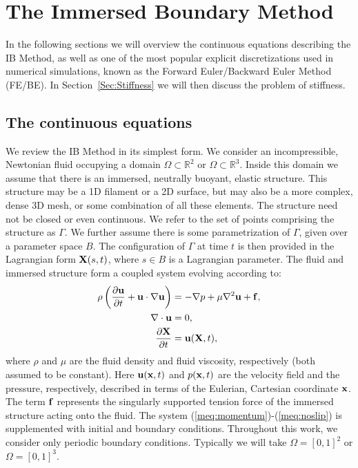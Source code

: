 \chapter{The Immersed Boundary Method}
\label{part:IB}
\noindent
In the following sections we will overview the continuous equations describing the IB Method, as well as one of the most popular explicit discretizations used in numerical simulations, known as the Forward Euler/Backward Euler Method (FE/BE). In Section~\ref{Sec:Stiffness} we will then discuss the problem of stiffness.

\section{The continuous equations}
\label{Sec:Continuous}
We review the IB Method in its simplest form. We consider an incompressible, Newtonian fluid occupying a domain $\Omega \subset \mathbb{R}^2$ or $\Omega \subset \mathbb{R}^3$. Inside this domain
we assume that there is an immersed, neutrally buoyant, elastic structure. This structure may be a 1D filament or a 2D surface, but may also be a more complex,  dense 3D mesh, or some combination of all these elements. The structure need not be closed or even continuous. We refer to the set of points comprising the structure as $\Gamma$. We further assume there is some parametrization of $\Gamma$, given over a parameter space $B$. The configuration of $\Gamma$ at time $t$ is then provided in the Lagrangian form $\mathbf{X}(s,t)$, where $s \in B$ is a Lagrangian parameter. The fluid and immersed structure form a coupled system evolving according to:
\begin{align}
\rho \left(\frac{\partial \mathbf{u}}{\partial t} + \mathbf{u}\cdot\nabla\mathbf{u} \right) &= -\nabla p + \mu\nabla^2 \mathbf{u} + \mathbf{f}, \label{meq:momentum}\\ 
\nabla \cdot \mathbf{u} &= 0, \label{meq:incompressibility}\\
\frac{\partial \mathbf{X}}{\partial t}  &= \mathbf{u}(\mathbf{X},t), \label{meq:noslip}
\end{align}
where $\rho$ and $\mu$ are the fluid density and fluid viscosity, respectively (both assumed to be constant). Here $\mathbf{u}(\mathbf{x},t)$ and $p(\mathbf{x},t)$ are the velocity field and the pressure, respectively, described in terms of the Eulerian, Cartesian coordinate $\mathbf{x}$. The term $\mathbf{f}$ represents the singularly supported tension force of the immersed structure acting onto the fluid. The system (\ref{meq:momentum})-(\ref{meq:noslip}) is supplemented with initial and boundary conditions. Throughout this work, we consider only periodic boundary conditions. Typically we will take $\Omega = [0,1]^2$ or $\Omega = [0,1]^3$.

